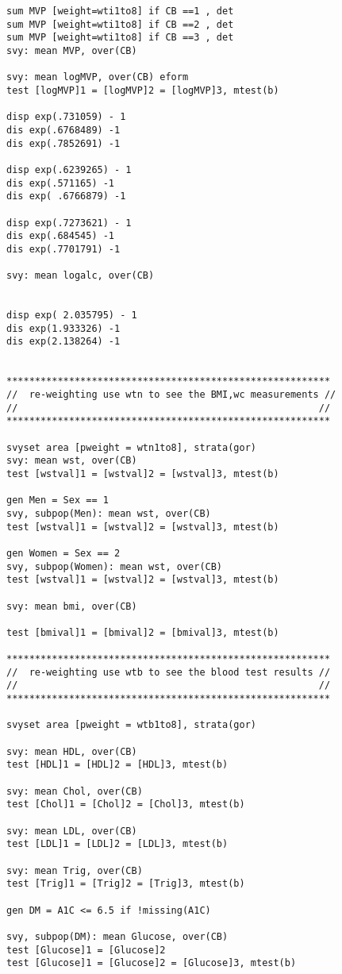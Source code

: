 \begin{verbatim}
sum MVP [weight=wti1to8] if CB ==1 , det
sum MVP [weight=wti1to8] if CB ==2 , det
sum MVP [weight=wti1to8] if CB ==3 , det
svy: mean MVP, over(CB)

svy: mean logMVP, over(CB) eform
test [logMVP]1 = [logMVP]2 = [logMVP]3, mtest(b) 

disp exp(.731059) - 1    
dis exp(.6768489) -1 
dis exp(.7852691) -1

disp exp(.6239265) - 1    
dis exp(.571165) -1 
dis exp( .6766879) -1

disp exp(.7273621) - 1    
dis exp(.684545) -1 
dis exp(.7701791) -1

svy: mean logalc, over(CB)


disp exp( 2.035795) - 1    
dis exp(1.933326) -1 
dis exp(2.138264) -1


*********************************************************
//  re-weighting use wtn to see the BMI,wc measurements //
//                                                     //
*********************************************************

svyset area [pweight = wtn1to8], strata(gor)
svy: mean wst, over(CB)
test [wstval]1 = [wstval]2 = [wstval]3, mtest(b) 

gen Men = Sex == 1 
svy, subpop(Men): mean wst, over(CB)
test [wstval]1 = [wstval]2 = [wstval]3, mtest(b) 

gen Women = Sex == 2
svy, subpop(Women): mean wst, over(CB)
test [wstval]1 = [wstval]2 = [wstval]3, mtest(b) 

svy: mean bmi, over(CB)

test [bmival]1 = [bmival]2 = [bmival]3, mtest(b) 

*********************************************************
//  re-weighting use wtb to see the blood test results //
//                                                     //
*********************************************************

svyset area [pweight = wtb1to8], strata(gor)

svy: mean HDL, over(CB)
test [HDL]1 = [HDL]2 = [HDL]3, mtest(b) 

svy: mean Chol, over(CB)
test [Chol]1 = [Chol]2 = [Chol]3, mtest(b) 

svy: mean LDL, over(CB)
test [LDL]1 = [LDL]2 = [LDL]3, mtest(b) 

svy: mean Trig, over(CB)
test [Trig]1 = [Trig]2 = [Trig]3, mtest(b) 

gen DM = A1C <= 6.5 if !missing(A1C)

svy, subpop(DM): mean Glucose, over(CB)
test [Glucose]1 = [Glucose]2
test [Glucose]1 = [Glucose]2 = [Glucose]3, mtest(b)


\end{verbatim}
